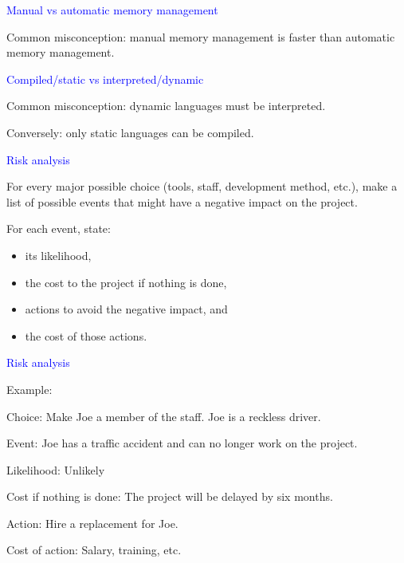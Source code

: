 \documentclass{slides}
\newcommand{\ti}[1]{\begin{center}\Large{\textcolor{blue}{#1}}\end{center}}
\begin{document}
\begin{slide}\ti{Manual vs automatic memory management}

Common misconception: manual memory management is faster than
automatic memory management.

\vfill\end{slide}
\begin{slide}\ti{Compiled/static vs interpreted/dynamic}

Common misconception: dynamic languages must be interpreted.

Conversely: only static languages can be compiled.

\vfill\end{slide}
\begin{slide}\ti{Risk analysis}

For every major possible choice (tools, staff, development method,
etc.), make a list of possible events that might have a negative
impact on the project.

For each event, state:

\begin{itemize}
\item its likelihood,
\item the cost to the project if nothing is done,
\item actions to avoid the negative impact, and
\item the cost of those actions.
\end{itemize}

\vfill\end{slide}
\begin{slide}\ti{Risk analysis}

Example:

Choice: Make Joe a member of the staff.  Joe is a reckless driver.

Event: Joe has a traffic accident and can no longer work on the
project.

Likelihood: Unlikely

Cost if nothing is done: The project will be delayed by six months.

Action: Hire a replacement for Joe.

Cost of action: Salary, training, etc.

\vfill\end{slide}
\end{document}
